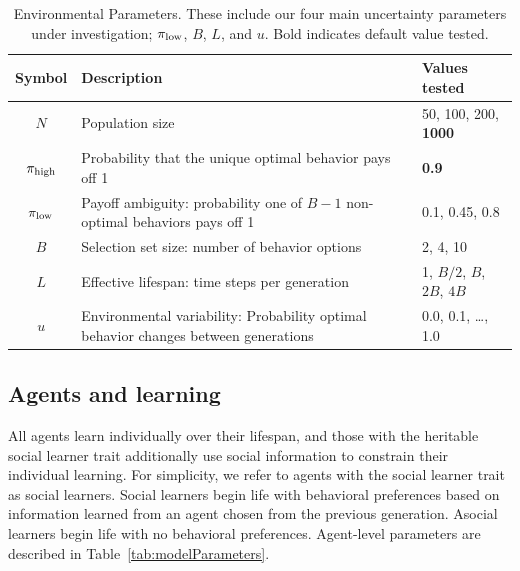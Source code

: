 \documentclass[letterpaper,11.5pt]{scrartcl}
\begin{document}
\vspace{2em}
\begin{table}[h]
\caption{Environmental Parameters. These include our four main uncertainty parameters under investigation; 
$\pi_{\mathrm{low}}$, $B$, $L$, and $u$. Bold indicates default value tested.} %
    \label{tab:uncertaintyParameters}
    \centering %
    \begin{tabular}{cp{4.0in}p{1.25in}} \toprule

        Symbol & Description & Values tested \\ 

        \midrule  
        $N$    & Population size
                 & 50, 100, 200, \textbf{1000} \\
               

        $\pi_{\mathrm{high}}$ & Probability that the unique optimal behavior pays off 1 
                & \textbf{0.9} \\

        $\pi_{\mathrm{low}}$ & Payoff ambiguity: probability one of $B - 1$ non-optimal behaviors pays off 1
                 & 0.1, 0.45, 0.8 \\ 

        $B$       & Selection set size: number of behavior options
                  & 2, 4, 10 \\
                  
        $L$    & Effective lifespan: time steps per generation & 1, $B/2$, $B$, $2B$, $4B$ \\
        
        $u$    & Environmental variability: Probability optimal behavior changes between generations
               & 0.0, 0.1, \ldots, 1.0 \\
               
        \bottomrule
        \end{tabular} 
\end{table}



\subsection{Agents and learning}

All agents learn individually over their lifespan, and those with
the heritable social learner trait additionally use social information to constrain their individual
learning. For simplicity, we refer to agents with the social learner trait 
as social learners. 
Social learners begin life with behavioral preferences based on information learned from an agent chosen from the previous generation. Asocial learners begin life with no behavioral preferences. Agent-level parameters are described in Table~\ref{tab:modelParameters}. 
\end{document}
